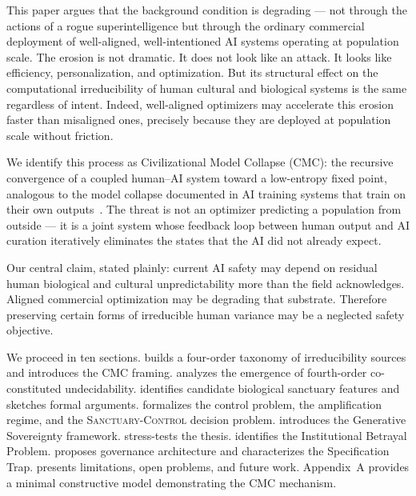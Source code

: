 \documentclass[11pt, a4paper]{article}
\theoremstyle{remark}
\newcommand{\SC}{\textsc{Sanctuary-Control}}
\begin{document}
This paper argues that the background condition is degrading --- not through the actions of a rogue superintelligence but through the ordinary commercial deployment of well-aligned, well-intentioned AI systems operating at population scale. The erosion is not dramatic. It does not look like an attack. It looks like efficiency, personalization, and optimization. But its structural effect on the computational irreducibility of human cultural and biological systems is the same regardless of intent.
Indeed, well-aligned optimizers may accelerate this erosion faster than misaligned ones, precisely because they are deployed at population scale without friction.

We identify this process as Civilizational Model Collapse (CMC): the recursive convergence of a coupled human--AI system toward a low-entropy fixed point, analogous to the model collapse documented in AI training systems that train on their own outputs~\cite{shumailov2024}. The threat is not an optimizer predicting a population from outside --- it is a joint system whose feedback loop between human output and AI curation iteratively eliminates the states that the AI did not already expect.

Our central claim, stated plainly: current AI safety may depend on residual human biological and cultural unpredictability more than the field acknowledges. Aligned commercial optimization may be degrading that substrate. Therefore preserving certain forms of irreducible human variance may be a neglected safety objective.

We proceed in ten sections.  builds a four-order taxonomy of irreducibility sources and introduces the CMC framing.  analyzes the emergence of fourth-order co-constituted undecidability.  identifies candidate biological sanctuary features and sketches formal arguments.  formalizes the control problem, the amplification regime, and the \SC{} decision problem.  introduces the Generative Sovereignty framework.  stress-tests the thesis.  identifies the Institutional Betrayal Problem.  proposes governance architecture and characterizes the Specification Trap.  presents limitations, open problems, and future work. Appendix~A provides a minimal constructive model demonstrating the CMC mechanism.

\end{document}
